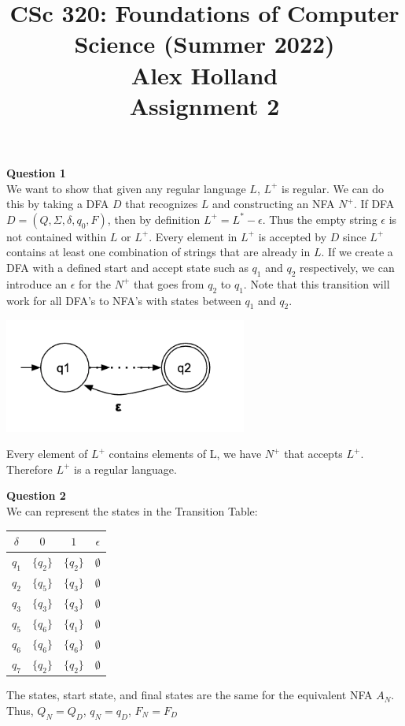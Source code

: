 \documentclass{article}
\title{%
   CSc 320: Foundations of Computer Science (Summer 2022)\\
    \Large Alex Holland\\
    Assignment 2\\
    }
\date{}
\begin{document}
\maketitle

{\bf Question 1}\\
We want to show that given any regular language $L$, $L^+$ is regular. We can do this by taking a DFA $D$ that recognizes $L$ and constructing an NFA $N^+$. If DFA $D=(Q,\Sigma,\delta,q_0,F)$, then by definition $L^+=L^*-\epsilon$. Thus the empty string $\epsilon$ is not contained within $L$ or $L^+$. Every element in $L^+$ is accepted by $D$ since $L^+$ contains at least one combination of strings that are already in $L$. If we create a DFA with a defined start and accept state such as $q_1$ and $q_2$ respectively, we can introduce an $\epsilon$ for the $N^+$ that goes from $q_2$ to $q_1$. Note that this transition will work for all DFA's to NFA's with states between $q_1$ and $q_2$. 

\begin{center}
    \includegraphics[width=0.6\textwidth]{1.png}
\end{center}

Every element of $L^+$ contains elements of L, we have $N^+$ that accepts $L^+$.  Therefore $L^+$ is a regular language.

\break
{\bf Question 2}\\
We can represent the states in the Transition Table:
\begin{center}
\begin{tabular}{||c c c c||} 
 \hline
 $\delta$ & $0$ & $1$ & $\epsilon$ \\ [0.5ex] 
 \hline\hline
 $q_1$ & $\{q_2\}$ &$\{q_2\}$ & $\emptyset$\\
 \hline
 $q_2$ & $\{q_5\}$ & $\{q_3\}$ & $\emptyset$\\
 \hline
 $q_3$ & $\{q_3\}$ & $\{q_3\}$ & $\emptyset$\\
 \hline
 $q_5$ & $\{q_6\}$ & $\{q_1\}$ & $\emptyset$\\
 \hline
 $q_6$ & $\{q_6\}$ & $\{q_6\}$ & $\emptyset$\\
 \hline
 $q_7$ & $\{q_2\}$ & $\{q_2\}$ & $\emptyset$\\
 \hline
\end{tabular}
\end{center}
The states, start state, and final states are the same for the equivalent NFA $A_N$.\\ 
Thus, $Q_N=Q_D$, $q_N=q_D$, $F_N=F_D$
\end{document}
